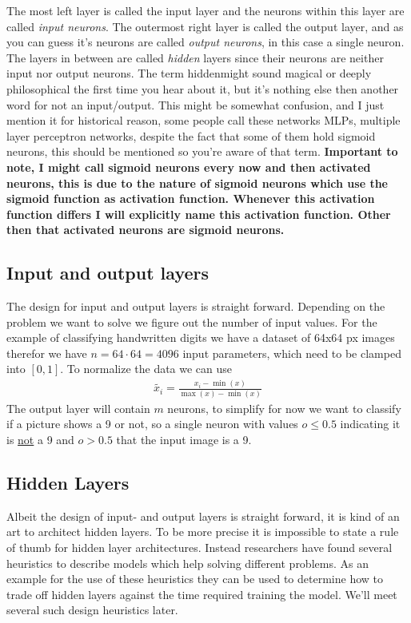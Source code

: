 \documentclass[10pt]{book}
\begin{document}
    The most left layer is called the input layer and the neurons within this layer are called \textit{input neurons}.
    The outermost right layer is called the output layer, and as you can guess it's neurons are called \textit{output neurons}, in this case a single neuron.
    The layers in between are called \textit{hidden} layers since their neurons are neither input nor output neurons. The term \dq hidden\dq might sound magical or
    deeply philosophical the first time you hear about it, but it's nothing else then another word for \dq not an input/output\dq.
    This might be somewhat confusion, and I just mention it for historical reason, some people call these networks
    MLPs, multiple layer perceptron networks, despite the fact that some of them hold sigmoid neurons, this should be mentioned
    so you're aware of that term.\newline
    \textbf{Important to note, I might call sigmoid neurons every now and then activated neurons, this is due to the nature of sigmoid neurons which use the sigmoid function as activation function.
    Whenever this activation function differs I will explicitly name this activation function. Other then that activated neurons are sigmoid neurons.}
    
    \subsection{Input and output layers}
    The design for input and output layers is straight forward. Depending on the problem we want to solve we
    figure out the number of input values. For the example of classifying handwritten digits we have a dataset of 64x64 px images
    therefor we have \(n = 64 \cdot 64 = 4096\) input parameters, which need to be clamped into \([0,1]\). To normalize the data we can use
    \begin{align}
        \tilde{x_i} = \frac{x_i - \min(x)}{\max(x)-\min(x)}
    \end{align}
    The output layer will contain \(m\) neurons, to simplify for now we want to classify if a picture shows a 9 or not, so a single neuron with values
    \(o \leq 0.5\) indicating it is \underline{not} a 9 and \(o > 0.5\) that the input image is a 9.

    \subsection{Hidden Layers}
    Albeit the design of input- and output layers is straight forward, it is kind of an art to architect hidden layers.
    To be more precise it is impossible to state a rule of thumb for hidden layer architectures. Instead researchers have found
    several heuristics to describe models which help solving different problems.
    As an example for the use of these heuristics they can be used to determine how to trade off hidden layers against the time required training the model.
    We'll meet several such design heuristics later.
    
\end{document}
